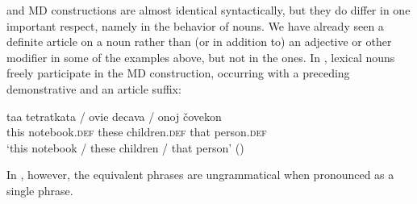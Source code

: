 \documentclass[output=paper,
colorlinks,
citecolor=brown,
newtxmath
]{langscibook}
\begin{document}
\ea \label{yourphonem}
\z\z

\noindent {} and  MD constructions are almost identical syntactically, but they do differ in one important respect, namely in the behavior of nouns. We have already seen a definite article on a noun rather than (or in addition to) an adjective or other modifier in some of the  examples above, but not in the  ones. In , lexical nouns freely participate in the MD construction, occurring with a preceding demonstrative and an article suffix:


\ea
\gll taa tetratkata / ovie decava / onoj čovekon \\
this notebook.\textsc{def} { } these children.\textsc{def} { } that person.\textsc{def} \\
\glt `this notebook / these children / that person' \hfill()
\z

\begin{sloppypar}
\noindent In , however, the equivalent phrases are ungrammatical when pronounced as a single phrase.
\end{sloppypar}

\end{document}
